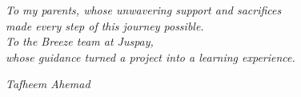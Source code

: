 \thispagestyle{empty}

\vspace{40mm}
\begin{center}
\textit{To my parents, whose unwavering support and sacrifices\\
made every step of this journey possible.}\\[6mm]
\textit{To the Breeze team at Juspay,\\
whose guidance turned a project into a learning experience.}
\end{center}

\vspace{110mm}
\begin{flushright}
\textit{Tafheem Ahemad}
\end{flushright}
